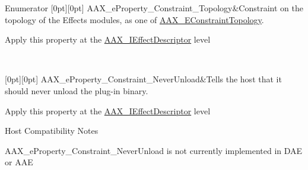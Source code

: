 \begin{DoxyEnumFields}{Enumerator}
[0pt][0pt]{}\mbox{\label{a00662_a13e384f22825afd3db6d68395b79ce0da5d7fca796aba48b5dc364af0cc633a02}} 
A\+A\+X\+\_\+e\+Property\+\_\+\+Constraint\+\_\+\+Topology&Constraint on the topology of the Effect\textquotesingle{}s modules, as one of \mbox{\hyperlink{a00491_a714f56a9b0ab98a3a5365760adf77624}{A\+A\+X\+\_\+\+E\+Constraint\+Topology}}. \begin{DoxyItemize}
\item Apply this property at the \mbox{\hyperlink{a01813}{A\+A\+X\+\_\+\+I\+Effect\+Descriptor}} level \end{DoxyItemize}
\\
\hline

[0pt][0pt]{}\mbox{\label{a00662_a13e384f22825afd3db6d68395b79ce0da734930f534d7af40835db1b12afb209e}} 
A\+A\+X\+\_\+e\+Property\+\_\+\+Constraint\+\_\+\+Never\+Unload&Tells the host that it should never unload the plug-\/in binary. \begin{DoxyItemize}
\item Apply this property at the \mbox{\hyperlink{a01813}{A\+A\+X\+\_\+\+I\+Effect\+Descriptor}} level\end{DoxyItemize}
\begin{DoxyRefDesc}{Host Compatibility Notes}
\item[\mbox{\hyperlink{a00786__compatibility_notes000071}{Host Compatibility Notes}}]A\+A\+X\+\_\+e\+Property\+\_\+\+Constraint\+\_\+\+Never\+Unload is not currently implemented in D\+AE or A\+AE \end{DoxyRefDesc}
\\
\hline


\end{DoxyEnumFields}
